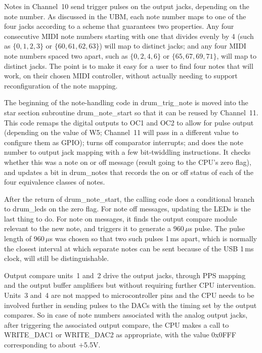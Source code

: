Notes in Channel~10 send trigger pulses on the output jacks, depending on
the note number.  As discussed in the UBM, each note number maps to one of
the four jacks according to a scheme that guarantees two properties.  Any
four consecutive MIDI note numbers starting with one that divides evenly by
4 (such as $\{0,1,2,3\}$ or $\{60,61,62,63\}$) will map to distinct jacks;
and any four MIDI note numbers spaced two apart, such as $\{0,2,4,6\}$ or
$\{65,67,69,71\}$, will map to distinct jacks.  The point is to make it easy
for a user to find four notes that will work, on their chosen MIDI
controller, without actually needing to support reconfiguration of the note
mapping.

The beginning of the note-handling code in drum\_trig\_note is moved into
the star section subroutine drum\_note\_start so that it can be reused by
Channel~11.  This code remaps the digital outputs to OC1 and OC2 to allow
for pulse output (depending on the value of W5; Channel~11 will pass in a
different value to configure them as GPIO); turns off comparator interrupts;
and does the note number to output jack mapping with a few bit-twiddling
instructions.  It checks whether this was a note on or off message (result
going to the CPU's zero flag), and updates a bit in drum\_notes that
records the on or off status of each of the four equivalence classes of
notes.

After the return of drum\_note\_start, the calling code does a conditional
branch to drum\_leds on the zero flag.  For note off messages, updating the
LEDs is the last thing to do.  For note on messages, it finds the output
compare module relevant to the new note, and triggers it to generate a
960\,$\mu$s pulse.  The pulse length of 960\,$\mu$s was chosen so that two
such pulses 1\,ms apart, which is normally the closest interval at which
separate notes can be sent because of the USB 1\,ms clock, will still be
distinguishable.

Output compare units~1 and~2 drive the output jacks, through PPS mapping and
the output buffer amplifiers but without requiring further CPU intervention. 
Units~3 and~4 are not mapped to microcontroller pins and the CPU needs to be
involved further in sending pulses to the DACs with the timing set by the
output compares.  So in case of note numbers associated with the analog
output jacks, after triggering the associated output compare, the CPU makes
a call to WRITE\_DAC1 or WRITE\_DAC2 as appropriate, with the value 0x0FFF
corresponding to about $+$5.5V.

